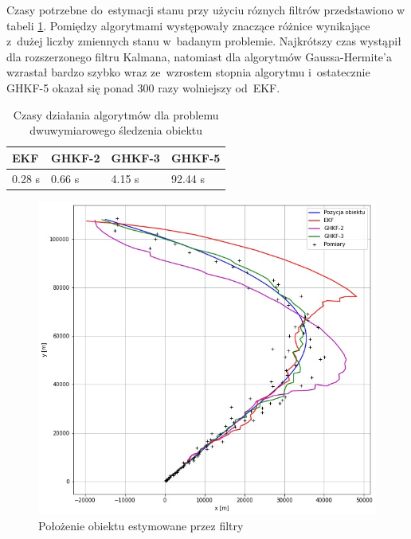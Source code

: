 Czasy potrzebne do~estymacji stanu przy użyciu róznych filtrów przedstawiono w tabeli \ref{tab:2D_tracking_times}. Pomiędzy algorytmami występowały znaczące różnice wynikające z~dużej liczby zmiennych stanu w~badanym problemie. Najkrótszy czas wystąpił dla rozszerzonego filtru Kalmana, natomiast dla algorytmów Gaussa-Hermite'a wzrastał bardzo szybko wraz ze~wzrostem stopnia algorytmu i~ostatecznie GHKF-5 okazał się ponad 300 razy wolniejszy od~EKF. 
\begin{table}[]
	\caption{Czasy działania algorytmów dla problemu dwuwymiarowego śledzenia obiektu}
	\label{tab:2D_tracking_times}
	\begin{center}
		\begin{tabular}{|l|l|l|l|}
			\hline
			\textbf{EKF} & \textbf{GHKF-2} & \textbf{GHKF-3} & \textbf{GHKF-5} \\ 
			\hline
			0.28 s & 0.66 s & 4.15 s & 92.44 s \\
			\hline
		\end{tabular}
	\end{center}
\end{table}
\begin{figure}
	\centering
	\includegraphics[width=\linewidth]{2D_tracking_positions.jpg}
	\caption{Położenie obiektu estymowane przez filtry}
	\label{fig:2D_tracking_positions}
\end{figure}
